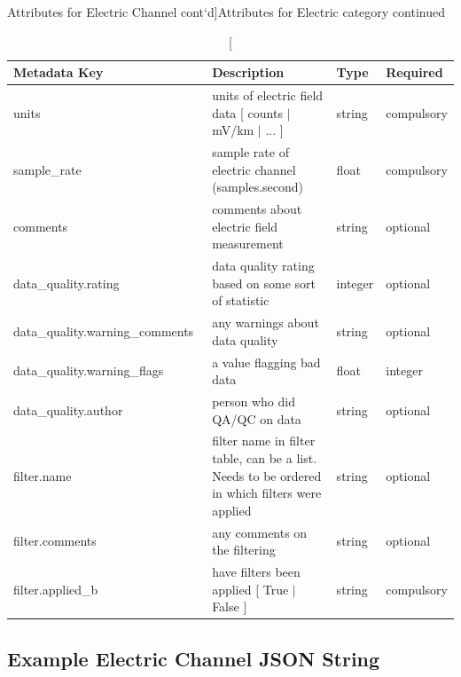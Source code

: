 \documentclass{article}
\begin{document}
\newpage
\begin{table}[htb!]
    \caption[Attributes for Electric Channel cont`d]{Attributes for Electric category continued}
    \begin{tabular}{|l|p{3in}|l|l|}
        \hline
        \textbf{Metadata Key} & \textbf{Description} & \textbf{Type} & \textbf{Required} \\ \hline
        units\ & units of electric field data [ counts $|$ mV/km $|$ ... ] & string & compulsory \\ \hline
        sample\_rate\ & sample rate of electric channel (samples.second) & float & compulsory \\ \hline
        comments\ & comments about electric field measurement & string &  optional \\ \hline
        data\_quality.rating\ & data quality rating based on some sort of statistic & integer & optional \\ \hline
        data\_quality.warning\_comments\ & any warnings about data quality & string & optional \\ \hline
        data\_quality.warning\_flags\ & a value flagging bad data  & float &  integer \\ \hline
        data\_quality.author\ & person who did QA/QC on data & string &  optional \\ \hline
        filter.name\ & filter name in filter table, can be a list. Needs to be ordered in which filters were applied & string &  optional \\ \hline
        filter.comments\ & any comments on the filtering & string &  optional \\ \hline
        filter.applied\_b & have filters been applied [ True $|$ False ] & string & compulsory \\ \hline
        \end{tabular}
        \label{tab:electric02}
\end{table}    

\newpage
\subsection{Example Electric Channel JSON String}
\end{document}
